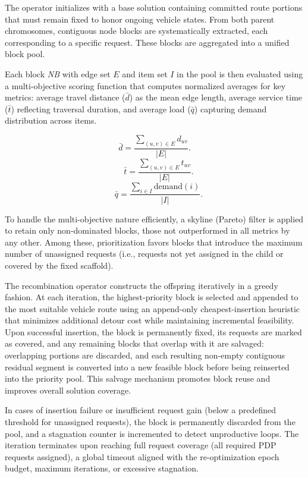 \documentclass[]{interact}
\begin{document}
The operator initializes with a base solution containing committed route portions that must remain fixed to honor ongoing vehicle states. From both parent chromosomes, contiguous node blocks are systematically extracted, each corresponding to a specific request. These blocks are aggregated into a unified block pool. 

Each block \textit{NB} with edge set \(E\) and item set \(I\) in the pool is then evaluated using a multi-objective scoring function that computes normalized averages for key metrics: average travel distance (\(\bar{d}\)) as the mean edge length, average service time (\(\bar{t}\)) reflecting traversal duration, and average load (\(\bar{q}\)) capturing demand distribution across items.

\begin{equation}
\bar{d} = \frac{\sum_{(u,v) \in E} d_{uv}}{|E|}.
\end{equation}
\begin{equation}
 \quad \bar{t} = \frac{\sum_{(u,v) \in E} t_{uv}}{|E|}.
\end{equation}
\begin{equation}
 \quad \bar{q} = \frac{\sum_{i \in I} \text{demand}(i)}{|I|}.
\end{equation}

To handle the multi-objective nature efficiently, a skyline (Pareto) filter is applied to retain only non-dominated blocks, those not outperformed in all metrics by any other. Among these, prioritization favors blocks that introduce the maximum number of unassigned requests (i.e., requests not yet assigned in the child or covered by the fixed scaffold).

The recombination operator constructs the offspring iteratively in a greedy fashion. At each iteration, the highest-priority block is selected and appended to the most suitable vehicle route using an append-only cheapest-insertion heuristic that minimizes additional detour cost while maintaining incremental feasibility. Upon successful insertion, the block is permanently fixed, its requests are marked as covered, and any remaining blocks that overlap with it are salvaged: overlapping portions are discarded, and each resulting non-empty contiguous residual segment is converted into a new feasible block before being reinserted into the priority pool. This salvage mechanism promotes block reuse and improves overall solution coverage.

In cases of insertion failure or insufficient request gain (below a predefined threshold for unassigned requests), the block is permanently discarded from the pool, and a stagnation counter is incremented to detect unproductive loops. The iteration terminates upon reaching full request coverage (all required PDP requests assigned), a global timeout aligned with the re-optimization epoch budget, maximum iterations, or excessive stagnation.
\end{document}
